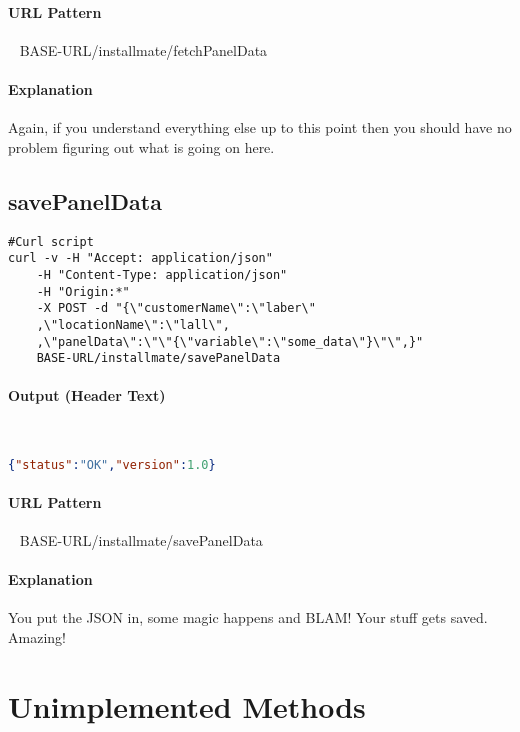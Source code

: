 \documentclass[
10pt, %
letterpaper, %
oneside, %
headinclude,footinclude, %
BCOR5mm, %
]{scrartcl}
\begin{document}
\paragraph{URL Pattern} 
~\newline
BASE-URL/installmate/fetchPanelData

\paragraph{Explanation} Again, if you understand everything else up to this point then you should have no problem figuring out what is going on here.  



\subsection{\textbf{savePanelData}}

\begin{lstlisting}
#Curl script
curl -v -H "Accept: application/json" 
	-H "Content-Type: application/json" 
	-H "Origin:*"
	-X POST -d "{\"customerName\":\"laber\"
	,\"locationName\":\"lall\",
	,\"panelData\":\"\"{\"variable\":\"some_data\"}\"\",}" 
	BASE-URL/installmate/savePanelData
\end{lstlisting}

\paragraph{Output (Header Text)}~
\begin{lstlisting}[language=json]
{"status":"OK","version":1.0}
\end{lstlisting}

\paragraph{URL Pattern} 
~\newline
BASE-URL/installmate/savePanelData

\paragraph{Explanation} You put the JSON in, some magic happens and BLAM! Your stuff gets saved. Amazing!


\section{Unimplemented Methods}
\end{document}
